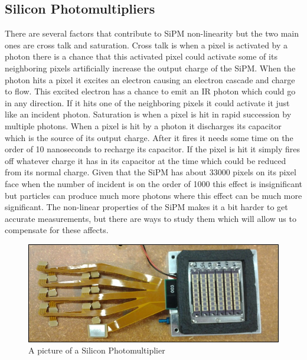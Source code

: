 \subsection{Silicon Photomultipliers}
There are several factors that contribute to SiPM non-linearity but the two main ones are cross talk and saturation. Cross talk is when a pixel is activated by a photon there is a chance that this activated pixel could activate some of its neighboring pixels artificially increase the output charge of the SiPM. When the photon hits a pixel it excites an electron causing an electron cascade and charge to flow. This excited electron has a chance to emit an IR photon which could go in any direction. If it hits one of the neighboring pixels it could activate it just like an incident photon. Saturation is when a pixel is hit in rapid succession by multiple photons. When a pixel is hit by a photon it discharges its capacitor which is the source of its output charge. After it fires it needs some time on the order of 10 nanoseconds to recharge its capacitor. If the pixel is hit it simply fires off whatever charge it has in its capacitor at the time which could be reduced from its normal charge. Given that the SiPM has about 33000 pixels on its pixel face when the number of incident is on the order of 1000 this effect is insignificant but particles can produce much more photons where this effect can be much more significant. The non-linear properties of the SiPM makes it a bit harder to get accurate measurements, but there are ways to study them which will allow us to compensate for these affects.

\begin{figure}
\centering
\includegraphics[width=\linewidth]{Figures/SiPM.jpg}
\caption{A picture of a Silicon Photomultiplier}
\label{fig:SiPM}
\end{figure}

